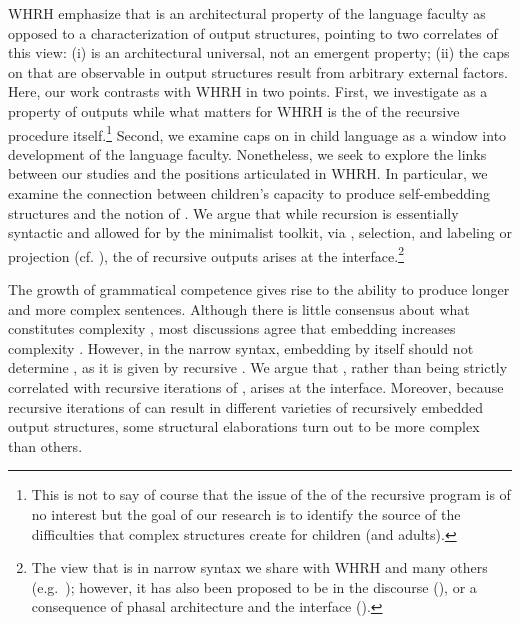 \documentclass[output=paper]{langsci/langscibook}
\begin{document}
WHRH\nocite{WatHauRobHor2014} emphasize that  is an
architectural property of the language faculty as opposed to a characterization
of output structures, pointing to two correlates of this view: (i)
 is an architectural universal, not an emergent property; (ii)
the caps on  that are observable in output structures re\-sult
from arbitrary external factors. Here, our work contrasts with
WHRH\nocite{WatHauRobHor2014} in two points. First, we investigate
 as a property of outputs while what matters for
WHRH\nocite{WatHauRobHor2014} is the  of the recursive
procedure itself.\footnote{This is not to say of course that the issue of the
     of the recursive program is of no interest but the
    goal of our research is to identify the source of the difficulties that
complex structures create for children (and adults).} Second, we examine caps
on  in child language as a window into development of the
language faculty. Nonetheless, we seek to explore the links between our studies
and the positions articulated in WHRH\nocite{WatHauRobHor2014}. In particular,
we examine the connection between children’s capacity to produce self-embedding
structures and the notion of . We argue that while recursion is
essentially syntactic and allowed for by the minimalist toolkit, via
, selection, and labeling or projection (cf.
\citealt{HauChoFit2002}), the  of recursive outputs
arises at the interface.\footnote{The view that  is in narrow
    syntax we share with WHRH\nocite{WatHauRobHor2014} and many others (e.g.\
    \citealt{Moro2008,NevPesRod2009}); however, it has also been proposed to be
    in the discourse (\citealt{EvaLev2009,Koschmann2010}), or a consequence of
phasal architecture and the interface (\citealt{ArsHin2010}).}

The growth of grammatical competence gives rise to the ability to produce
longer and more complex sentences. Although there is little consensus about
what constitutes complexity
\parencite{Culicover2013,RoeSpea2014,TroBay2015,NewPre2014,McWhorter2011}, most
discussions agree that embedding increases complexity
\parencite{CulJac2006,Givon2009}. However, in the narrow syntax, embedding by
itself should not determine , as it is given by recursive . We
argue that \isi{complexity}, rather than being strictly correlated with recursive
iterations of , arises at the interface.  Moreover, because recursive
iterations of \isi{Merge} can result in different varieties of recursively embedded
output structures, some structural elaborations turn out to be more complex
than others.
\end{document}
